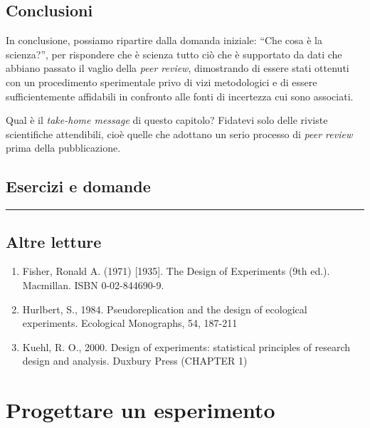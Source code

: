 \documentclass[
  12pt,
]{book}
\providecommand{\tightlist}{%
  \setlength{\itemsep}{0pt}\setlength{\parskip}{0pt}}
\begin{document}
\hypertarget{conclusioni}{%
\section{Conclusioni}\label{conclusioni}}

In conclusione, possiamo ripartire dalla domanda iniziale: ``Che cosa è la scienza?'', per rispondere che è scienza tutto ciò che è supportato da dati che abbiano passato il vaglio della \emph{peer review}, dimostrando di essere stati ottenuti con un procedimento sperimentale privo di vizi metodologici e di essere sufficientemente affidabili in confronto alle fonti di incertezza cui sono associati.

Qual è il \emph{take-home message} di questo capitolo? Fidatevi solo delle riviste scientifiche attendibili, cioè quelle che adottano un serio processo di \emph{peer review} prima della pubblicazione.

\hypertarget{esercizi-e-domande}{%
\section{Esercizi e domande}\label{esercizi-e-domande}}

\begin{center}\rule{0.5\linewidth}{0.5pt}\end{center}

\hypertarget{altre-letture}{%
\section{Altre letture}\label{altre-letture}}

\begin{enumerate}
\def\labelenumi{\arabic{enumi}.}
\tightlist
\item
  Fisher, Ronald A. (1971) {[}1935{]}. The Design of Experiments (9th ed.). Macmillan. ISBN 0-02-844690-9.
\item
  Hurlbert, S., 1984. Pseudoreplication and the design of ecological experiments. Ecological Monographs, 54, 187-211
\item
  Kuehl, R. O., 2000. Design of experiments: statistical principles of research design and analysis. Duxbury Press (CHAPTER 1)
\end{enumerate}

\hypertarget{progettare-un-esperimento}{%
\chapter{Progettare un esperimento}\label{progettare-un-esperimento}}
\end{document}
